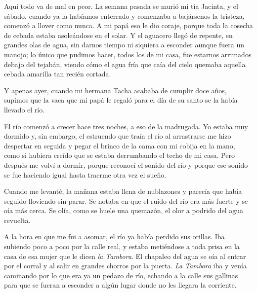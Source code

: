 
\begin{pages}
	\begin{Leftside}
		\beginnumbering

			Aquí todo va de mal en peor. La semana pasada se murió mi tía Jacinta, y el sábado, cuando ya la habíamos enterrado y comenzaba a bajársenos la tristeza, comenzó a llover como nunca. A mi papá eso le dio coraje, porque toda la cosecha de cebada estaba asoleándose en el solar. Y el aguacero llegó de repente, en grandes olas de agua, sin darnos tiempo ni siquiera a esconder aunque fuera un manojo; lo único que pudimos hacer, todos los de mi casa, fue estarnos arrimados debajo del tejabán, viendo cómo el agua fría que caía del cielo quemaba aquella cebada amarilla tan recién cortada.
		\pend

		\pstart
			Y apenas ayer, cuando mi hermana Tacha acababa de cumplir doce años, supimos que la vaca que mi papá le regaló para el día de su santo se la había llevado el río.
		\pend

		\pstart
			El río comenzó a crecer hace tres noches, a eso de la madrugada. Yo estaba muy dormido y, sin embargo, el estruendo que traía el río al arrastrarse me hizo despertar en seguida y pegar el brinco de la cama con mi cobija en la mano, como si hubiera creído que se estaba derrumbando el techo de mi casa. Pero después me volví a dormir, porque reconocí el sonido del río y porque ese sonido se fue haciendo igual hasta traerme otra vez el sueño.
		\pend

		\pstart
			Cuando me levanté, la mañana estaba llena de nublazones y parecía que había seguido lloviendo sin parar. Se notaba en que el ruido del río era más fuerte y se oía más cerca. Se olía, como se huele una quemazón, el olor a podrido del agua revuelta.
		\pend

		\pstart
			A la hora en que me fui a asomar, el río ya había perdido sus orillas. Iba subiendo poco a poco por la calle real, y estaba metiéndose a toda prisa en la casa de esa mujer que le dicen \textit{la Tambora}. El chapaleo del agua se oía al entrar por el corral y al salir en grandes chorros por la puerta. \textit{La Tambora} iba y venía caminando por lo que era ya un pedazo de río, echando a la calle sus gallinas para que se fueran a esconder a algún lugar donde no les llegara la corriente.
		\pend


\end{Leftside}
\end{pages}

